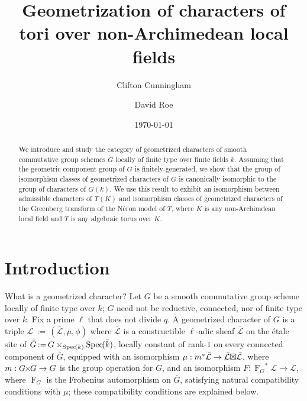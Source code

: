\documentclass[11pt]{amsart}
\title[Geometrization of characters of tori]{Geometrization of characters of tori over non-Archimedean local fields}
\date{\today}
\author{Clifton Cunningham}
\author{David Roe}
\theoremstyle{plain}
\theoremstyle{definition}
\theoremstyle{remark}
\newcommand{\Spec}[1]{{\operatorname{Spec}\hskip-1pt( #1 )}}
\newcommand{\bFq}{\bar{k}}
\newcommand{\Fq}{k}
\newcommand{\Frob}[1]{{\operatorname{F}_{#1}}}
\newcommand{\ceq}{{\, :=\, }}
\newcommand{\cs}[1]{{\mathcal{#1}}}
\newcommand{\gcs}[1]{{\mathcal{\bar #1}}}
\newcommand{\bG}{\bar{G}}
\newcommand{\tight}[3]{\hspace{-#1pt}{#2}\hspace{-#3pt}}
\newcommand{\GxG}{\text{$G \tight{1}{\times}{1} G$}}
\newcommand{\LxL}{\text{$\gcs{L} \tight{0}{\boxtimes}{0} \gcs{L}$}}
\begin{document}
\begin{abstract}
  We introduce and study the category of geometrized characters of smooth commutative
  group schemes $G$ locally of finite type over finite fields
  $\Fq$. Assuming that the geometric component group of $G$
  is finitely-generated, we show that the group of isomorphism classes
  of geometrized characters of $G$ is canonically isomorphic to the group
  of characters of $G(\Fq)$. We use this result to exhibit an
  isomorphism between admissible characters of $T(K)$ and isomorphism
  classes of geometrized characters of the Greenberg transform of the Néron
  model of $T$, where $K$ is any non-Archimdean local field and $T$ is
  any algebraic torus over $K$.
\end{abstract}

\maketitle

\section*{Introduction}

%
What is a geometrized character?
Let $G$ be a smooth commutative group scheme locally of finite
type over $\Fq$; $G$ need not be reductive, connected, nor of
finite type over $\Fq$. Fix a prime $\ell$ that does not divide
$q$. A geometrized character of $G$ is a triple $\cs{L}\ceq
(\gcs{L},\mu,\phi)$ where $\gcs{L}$ is a constructible $\ell$-adic sheaf
$\gcs{L}$ on the \'etale site of $\bG \ceq G \times_{\Spec\Fq}
\Spec{\bFq}$, locally constant of rank-$1$ on every connected
component of $\bG$, equipped with an isomorphism $\mu: m^*
\gcs{L} \to \LxL$, where $m : \GxG \to G$ is
the group operation for $G$, and an isomorphism $F : \Frob{G}^*
\gcs{L} \to \gcs{L}$, where $\Frob{G}$ is the Frobenius automorphism
on $\bG$, satisfying natural compatibility conditions with $\mu$;
these compatibility conditions are explained below.
\end{document}
